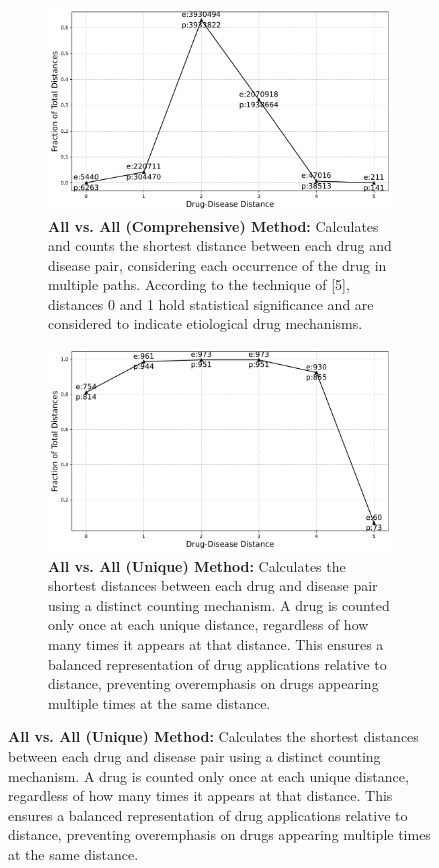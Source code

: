 \documentclass[journal,twoside,web]{ieeecolor}
\begin{document}
\begin{figure}
\centering
\begin{subfigure}{\linewidth}
   \includegraphics[width=\linewidth]{Figures/Yildrim_all_shortest_distance.pdf}
   \caption{\textbf{All vs. All (Comprehensive) Method:} Calculates and counts the shortest distance between each drug and disease pair, considering each occurrence of the drug in multiple paths.
   According to the technique of [5], 
   distances 0 and 1 hold statistical significance and are considered to indicate etiological drug mechanisms.}
   \label{fig:yildirim1}
\end{subfigure}
\begin{subfigure}{\linewidth}
   \includegraphics[width=\linewidth]{Figures/Yildrim_ALL_unique_drug_count_shortest_distance.pdf}
   \caption{\textbf{All vs. All (Unique) Method:} 
   Calculates the shortest distances between each drug and disease pair using a distinct counting mechanism. A drug is counted only once at each unique distance, regardless of how many times it appears at that distance. This ensures a balanced representation of drug applications relative to distance, preventing overemphasis on drugs appearing multiple times at the same distance.}

\end{subfigure}
\end{figure}
\end{document}
